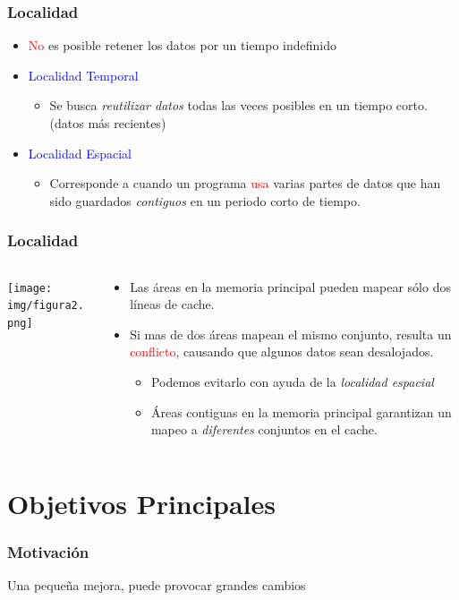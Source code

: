 \documentclass{beamer}
\begin{document}
\frame
{
\frametitle{Localidad}
\begin{itemize}
	\item<1->\textcolor{red}{No} es posible retener los datos por un tiempo indefinido
	\item<2->\textcolor{blue}{Localidad Temporal}
	\begin{itemize}
		\item<3->Se busca \emph{reutilizar datos} todas las veces posibles en un tiempo corto.(datos más recientes)
	\end{itemize}
	\item<4->\textcolor{blue}{Localidad Espacial}
	\begin{itemize}
		\item<5->Corresponde a cuando un programa \textcolor{red}{usa} varias partes de datos que han sido guardados \emph{contiguos} en un periodo corto de tiempo.
	\end{itemize}
\end{itemize}
}
\frame
{
\frametitle{Localidad}
\begin{columns}
	\begin{column}{0.4\textwidth}
		\texttt{[image: img/figura2.png]}
	\end{column}
	\begin{column}{0.6\textwidth}
		\begin{itemize}
			\item<1->Las áreas en la memoria principal pueden mapear sólo dos líneas de cache.
			\item<2->Si mas de dos áreas mapean el mismo conjunto, resulta un \textcolor{red}{conflicto}, causando que algunos datos sean desalojados.
			\begin{itemize}
				\item<3->Podemos evitarlo con ayuda de la \emph{localidad espacial}
				\item<4->Áreas contiguas en la memoria principal garantizan un mapeo a \emph{diferentes} conjuntos en el cache.
			\end{itemize}
		\end{itemize}
	\end{column}
\end{columns}
}

\section{Objetivos Principales}
\frame
{
\frametitle{Motivación}
\begin{center}
	\Huge Una pequeña mejora, puede provocar grandes cambios
\end{center}
}
\end{document}

